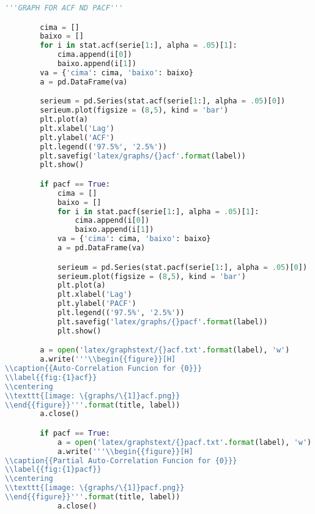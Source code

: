 \begin{lstlisting}[language=Python]
        '''GRAPH FOR ACF ND PACF'''

        cima = []
        baixo = []
        for i in stat.acf(serie[1:], alpha = .05)[1]:
            cima.append(i[0])
            baixo.append(i[1])
        va = {'cima': cima, 'baixo': baixo}
        a = pd.DataFrame(va)

        serieum = pd.Series(stat.acf(serie[1:], alpha = .05)[0])
        serieum.plot(figsize = (8,5), kind = 'bar')
        plt.plot(a)
        plt.xlabel('Lag')
        plt.ylabel('ACF')
        plt.legend(('97.5%', '2.5%'))
        plt.savefig('latex/graphs/{}acf'.format(label))
        plt.show()

        if pacf == True:
            cima = []
            baixo = []
            for i in stat.pacf(serie[1:], alpha = .05)[1]:
                cima.append(i[0])
                baixo.append(i[1])
            va = {'cima': cima, 'baixo': baixo}
            a = pd.DataFrame(va)

            serieum = pd.Series(stat.pacf(serie[1:], alpha = .05)[0])
            serieum.plot(figsize = (8,5), kind = 'bar')
            plt.plot(a)
            plt.xlabel('Lag')
            plt.ylabel('PACF')
            plt.legend(('97.5%', '2.5%'))
            plt.savefig('latex/graphs/{}pacf'.format(label))
            plt.show()

        a = open('latex/graphstext/{}acf.txt'.format(label), 'w')
        a.write('''\\begin{{figure}}[H]
\\caption{{Auto-Correlation Funcion for {0}}}
\\label{{fig:{1}acf}}
\\centering
\\texttt{[image: \{graphs/\{1]}acf.png}}
\\end{{figure}}'''.format(title, label))
        a.close() 

        if pacf == True:
            a = open('latex/graphstext/{}pacf.txt'.format(label), 'w')
            a.write('''\\begin{{figure}}[H]
\\caption{{Partial Auto-Correlation Funcion for {0}}}
\\label{{fig:{1}pacf}}
\\centering
\\texttt{[image: \{graphs/\{1]}pacf.png}}
\\end{{figure}}'''.format(title, label))
            a.close() 
        
\end{lstlisting}